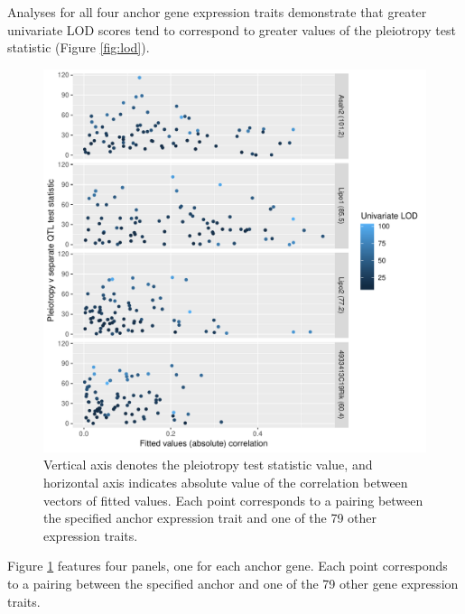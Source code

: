 \documentclass{article}
\begin{document}
Analyses for all four anchor gene expression traits demonstrate that greater univariate LOD scores tend to correspond to greater values of the pleiotropy test statistic (Figure \ref{fig:lod}). 









\begin{figure}
    \centering
    \includegraphics[width = \textwidth]{../Rmd/lrt-v-corr.pdf}
    \caption[Pleiotropy LRT vs. fitted values correlations plots reveal little evidence for a relationship.]{Vertical axis denotes the pleiotropy test statistic value, and horizontal axis indicates absolute value of the correlation between vectors of fitted values. Each point corresponds to a pairing between the specified anchor expression trait and one of the 79 other expression traits.}
    \label{fig:cor}
\end{figure}

Figure \ref{fig:cor} features four panels, one for each anchor gene. Each point corresponds to a pairing between the specified anchor and one of the 79 other gene expression traits.
\end{document}
